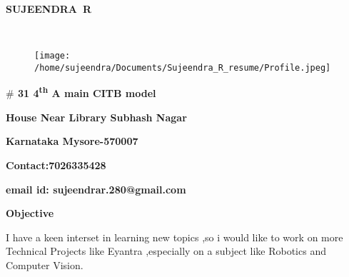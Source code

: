 \documentclass[12pt]{article}
\begin{document}
\begin{Center}
{\fontsize{16pt}{19.2pt}\selectfont  \textbf{ SUJEENDRA\ R\ \   }{\fontsize{13pt}{15.6pt}\selectfont \textbf{\ \ \ \ \ \ \ \ \ \ \  }\par}\par}\par

\end{Center}


\begin{figure}[H]
	\begin{FlushRight}		\texttt{[image: /home/sujeendra/Documents/Sujeendra\_R\_resume/Profile.jpeg]}
	\end{FlushRight}\end{figure}



\vspace{-4.2cm}

{\fontsize{13pt}{15.6pt}\selectfont \textbf{$\#$ 31 4\textsuperscript{th} A main CITB model}\par}\par

{\fontsize{13pt}{15.6pt}\selectfont \textbf{House Near Library Subhash Nagar}\par}\par

{\fontsize{13pt}{15.6pt}\selectfont \textbf{Karnataka Mysore-570007}\par}\par

{\fontsize{13pt}{15.6pt}\selectfont \textbf{Contact:7026335428}\par}\par

{\fontsize{13pt}{15.6pt}\selectfont \textbf{email id: sujeendrar.280@gmail.com}\par}


\vspace{\baselineskip}

\vspace{\baselineskip}

\vspace{\baselineskip}
{\fontsize{14pt}{16.8pt}\selectfont \textbf{Objective}\par}\par

{\fontsize{13pt}{15.6pt}\selectfont I have a keen interset in learning new topics ,so i would like to work on more Technical Projects like Eyantra ,especially on a subject like Robotics and Computer Vision.\par}\par
\end{document}
